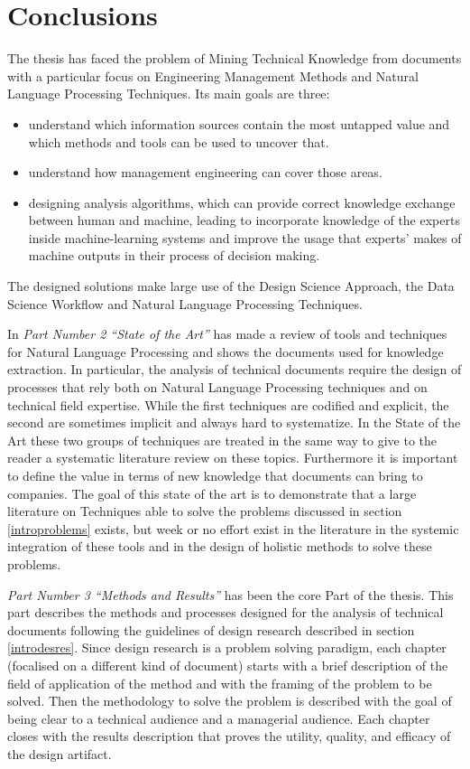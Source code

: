 \documentclass[b5paper,]{book}
\providecommand{\tightlist}{%
  \setlength{\itemsep}{0pt}\setlength{\parskip}{0pt}}
\theoremstyle{definition}
\theoremstyle{definition}
\theoremstyle{definition}
\theoremstyle{remark}
\begin{document}
\part{Conclusions}\label{part-conclusions}

The thesis has faced the problem of Mining Technical Knowledge from
documents with a particular focus on Engineering Management Methods and
Natural Language Processing Techniques. Its main goals are three:

\begin{itemize}
\tightlist
\item
  understand which information sources contain the most untapped value
  and which methods and tools can be used to uncover that.
\item
  understand how management engineering can cover those areas.
\item
  designing analysis algorithms, which can provide correct knowledge
  exchange between human and machine, leading to incorporate knowledge
  of the experts inside machine-learning systems and improve the usage
  that experts' makes of machine outputs in their process of decision
  making.
\end{itemize}

The designed solutions make large use of the Design Science Approach,
the Data Science Workflow and Natural Language Processing Techniques.

In \emph{Part Number 2 ``State of the Art''} has made a review of tools
and techniques for Natural Language Processing and shows the documents
used for knowledge extraction. In particular, the analysis of technical
documents require the design of processes that rely both on Natural
Language Processing techniques and on technical field expertise. While
the first techniques are codified and explicit, the second are sometimes
implicit and always hard to systematize. In the State of the Art these
two groups of techniques are treated in the same way to give to the
reader a systematic literature review on these topics. Furthermore it is
important to define the value in terms of new knowledge that documents
can bring to companies. The goal of this state of the art is to
demonstrate that a large literature on Techniques able to solve the
problems discussed in section \ref{introproblems} exists, but week or no
effort exist in the literature in the systemic integration of these
tools and in the design of holistic methods to solve these problems.

\emph{Part Number 3 ``Methods and Results''} has been the core Part of
the thesis. This part describes the methods and processes designed for
the analysis of technical documents following the guidelines of design
research described in section \ref{introdesres}. Since design research
is a problem solving paradigm, each chapter (focalised on a different
kind of document) starts with a brief description of the field of
application of the method and with the framing of the problem to be
solved. Then the methodology to solve the problem is described with the
goal of being clear to a technical audience and a managerial audience.
Each chapter closes with the results description that proves the
utility, quality, and efficacy of the design artifact.
\end{document}
